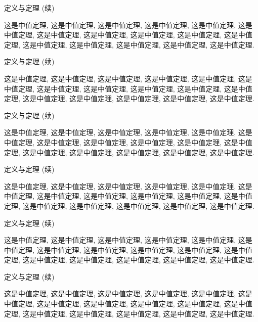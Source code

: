 \documentclass[8pt,compress,t,notheorems,noamsthm,notheorem,xcolor=x11names]{beamer}
\theoremstyle{nonumberplain}%
\theoremstyle{plain}
\begin{document}
\begin{frame}{定义与定理 (续)}
  \begin{theorem}[中值定理]
    这是中值定理, 这是中值定理, 这是中值定理, 这是中值定理,
    这是中值定理, 这是中值定理, 这是中值定理, 这是中值定理,
    这是中值定理, 这是中值定理, 这是中值定理, 这是中值定理,
    这是中值定理, 这是中值定理, 这是中值定理, 这是中值定理.
  \end{theorem}
\end{frame}


\begin{frame}{定义与定理 (续)}
\begin{corollary}[推论1]
	这是中值定理, 这是中值定理, 这是中值定理, 这是中值定理,
	这是中值定理, 这是中值定理, 这是中值定理, 这是中值定理,
	这是中值定理, 这是中值定理, 这是中值定理, 这是中值定理,
	这是中值定理, 这是中值定理, 这是中值定理, 这是中值定理.
\end{corollary}
\end{frame}

\begin{frame}{定义与定理 (续)}
\begin{lemma}[引理1]
	这是中值定理, 这是中值定理, 这是中值定理, 这是中值定理,
	这是中值定理, 这是中值定理, 这是中值定理, 这是中值定理,
	这是中值定理, 这是中值定理, 这是中值定理, 这是中值定理,
	这是中值定理, 这是中值定理, 这是中值定理, 这是中值定理.
\end{lemma}
\end{frame}

\begin{frame}{定义与定理 (续)}
\begin{example}[例一]
	这是中值定理, 这是中值定理, 这是中值定理, 这是中值定理,
	这是中值定理, 这是中值定理, 这是中值定理, 这是中值定理,
	这是中值定理, 这是中值定理, 这是中值定理, 这是中值定理,
	这是中值定理, 这是中值定理, 这是中值定理, 这是中值定理.
\end{example}
\end{frame}

\begin{frame}{定义与定理 (续)}
\begin{example}[例二]
	这是中值定理, 这是中值定理, 这是中值定理, 这是中值定理,
	这是中值定理, 这是中值定理, 这是中值定理, 这是中值定理,
	这是中值定理, 这是中值定理, 这是中值定理, 这是中值定理,
	这是中值定理, 这是中值定理, 这是中值定理, 这是中值定理.
\end{example}
\end{frame}


\begin{frame}{定义与定理 (续)}
\begin{lemma}
	这是中值定理, 这是中值定理, 这是中值定理, 这是中值定理,
	这是中值定理, 这是中值定理, 这是中值定理, 这是中值定理,
	这是中值定理, 这是中值定理, 这是中值定理, 这是中值定理,
	这是中值定理, 这是中值定理, 这是中值定理, 这是中值定理.
\end{lemma}
\end{frame}
\end{document}
